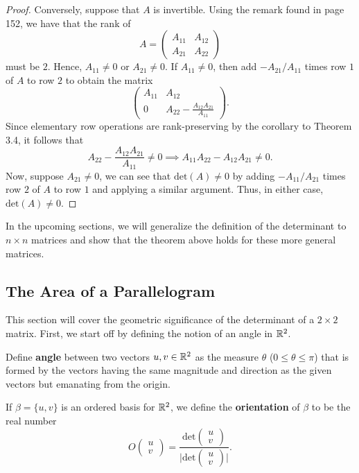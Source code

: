 \begin{proof}
 Conversely, suppose that \( A  \) is invertible. Using the remark found in page 152, we have that the rank of 
 \[ A = \begin{pmatrix}
     {A}_{11} & {A}_{12} \\
     {A}_{21} & {A}_{22}
 \end{pmatrix}  \] must be \( 2  \). Hence, \( {A}_{11} \neq  0  \) or \( {A}_{21} \neq 0  \). If \( {A}_{11} \neq 0  \), then add \( - {A}_{21} / {A}_{11} \) times row \( 1  \) of \( A  \) to row \( 2 \) to obtain the matrix
 \[  \begin{pmatrix}
     {A}_{11} & {A}_{12} \\
     0 & {A}_{22} - \frac{ {A}_{12} {A}_{21}  }{ {A}_{11} } 
 \end{pmatrix}. \]
 Since elementary row operations are rank-preserving by the corollary to Theorem 3.4, it follows that
 \[  {A}_{22} - \frac{ {A}_{12} {A}_{21}  }{  {A}_{11} }  \neq  0 \implies {A}_{11} {A}_{22} - {A}_{12} {A}_{21} \neq 0.  \]
 Now, suppose \( {A}_{21} \neq  0  \), we can see that \( \text{det}(A) \neq  0  \) by adding \( - {A}_{11} / {A}_{21} \) times row \( 2  \) of \( A  \) to row \( 1  \) and applying a similar argument. Thus, in either case, \( \text{det}(A) \neq  0 \).
 
\end{proof}

In the upcoming sections, we will generalize the definition of the determinant to \( n \times n  \) matrices and show that the theorem above holds for these more general matrices.

\subsection{The Area of a Parallelogram}

This section will cover the geometric significance of the determinant of a \( 2 \times 2  \) matrix. First, we start off by defining the notion of an angle in \( \mathbb{R}^{2} \).

\begin{definition}[Angle]
    Define \textbf{angle} between two vectors \( u,v \in \mathbb{R}^{2} \) as the measure \( \theta  \) (\( 0 \leq \theta \leq \pi \)) that is formed by the vectors having the same magnitude and direction as the given vectors but emanating from the origin.
\end{definition}

\begin{definition}[Orientation]
    If \( \beta = \{ u,v \}  \) is an ordered basis for \( \mathbb{R}^{2}  \), we define the \textbf{orientation} of \( \beta \) to be the real number 
    \[  O \begin{pmatrix}
        u \\
        v
    \end{pmatrix} = \frac{ \text{det} \begin{pmatrix}
        u \\
        v
    \end{pmatrix}  }{  \Big| \text{det} \begin{pmatrix}
        u \\
        v
    \end{pmatrix} \Big|   }. \]
\end{definition}
